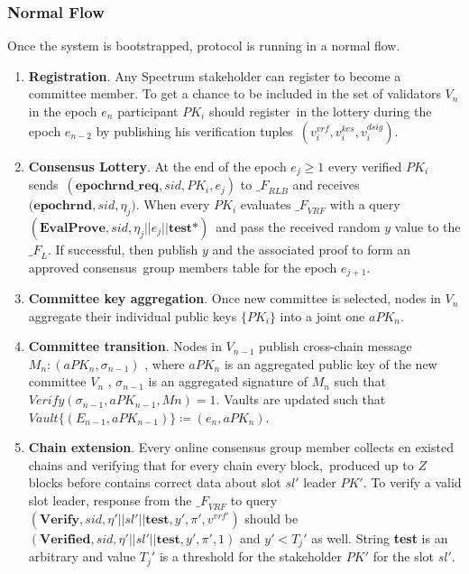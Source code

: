 \subsubsection{Normal Flow}\label{subsubsec:normal-flow}
Once the system is bootstrapped, protocol is running in a normal flow.
\begin{enumerate}[listparindent=0.5cm,
    align=left]
    \item \textbf{Registration}.
    Any Spectrum stakeholder can register to become a committee member.
    To get a chance to be included in the set of validators $V_n$ in the epoch $e_n$ participant $PK_i$ should register\
    in the lottery during the epoch $e_{n-2}$ by publishing his verification tuples\
    ${(v_i^{vrf}, v_i^{kes}, v_i^{dsig})}$.

    \item \textbf{Consensus Lottery}.
    At the end of the epoch ${e_j \geqslant 1}$ every verified $PK_i$ sends\
    ${(\textbf{epochrnd\_req}, sid, PK_i, e_j)}$ to ${\mathcal_{F}}_{RLB}$ and receives\
    $({\textbf{epochrnd}, sid, \eta_j)}$.
    When every $PK_i$ evaluates ${\mathcal_{F}}_{VRF}$ with a query\
    ${(\textbf{EvalProve}, sid, \eta_j || e_j || \textbf{test*})}$\
    and pass the received random $y$ value to the ${\mathcal_{F}}_{L}$.
    If successful, then publish $y$ and the associated proof to form an approved consensus\
    group members table for the epoch ${e_{j + 1}}$.

    \item \textbf{Committee key aggregation}.
    Once new committee is selected, nodes in $V_n$ aggregate their individual public keys $\{PK_i\}$ into
    a joint one $aPK_n$.

    \item \textbf{Committee transition}.
    Nodes in $V_{n-1}$ publish cross-chain message ${M_n : (aPK_n, \sigma_{n-1})}$ , where $aPK_n$ is
    an aggregated public key of the new committee $V_n$ , $\sigma_{n-1}$ is an aggregated signature of
    $M_n$ such that ${Verify(\sigma_{n-1}, aPK_{n-1}, Mn) = 1}$.
    Vaults are updated such that ${Vault\{(E_{n-1}, aPK_{n-1})\} \coloneqq (e_n, aPK_n)}$.

    \item \textbf{Chain extension}.
    Every online consensus group member collects en existed chains and verifying that for every chain every block,\
    produced up to $Z$ blocks before contains correct data about slot $sl'$ leader $PK'$.
    To verify a valid slot leader, response from the ${\mathcal_{F}}_{VRF}$ to query\
    ${(\textbf{Verify}, sid, \eta' || sl' || \textbf{test}, y', \pi', v^{vrf'})}$ should be\
    ${(\textbf{Verified}, sid, \eta' || sl' || \textbf{test}, y', \pi', 1)}$ and $y'<T_j'$ as well.
    String \textbf{test} is an arbitrary and value $T_j'$ is a threshold for the stakeholder $PK'$ for the slot $sl'$.


\end{enumerate}
